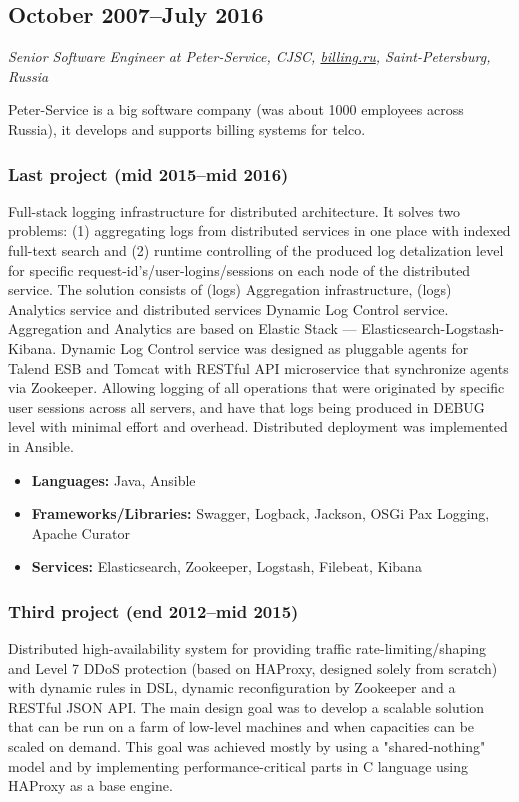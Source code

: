 \subsection*{October 2007--July 2016}

\textit{Senior Software Engineer at Peter-Service, CJSC,
\href{https://billing.ru}{\url{billing.ru}}, Saint-Petersburg, Russia}

Peter-Service is a big software company (was about 1000 employees
across Russia), it develops and supports billing systems for telco.

\subsubsection*{Last project (mid 2015--mid 2016)}

Full-stack logging infrastructure for distributed architecture. It
solves two problems: (1) aggregating logs from distributed services in
one place with indexed full-text search and (2) runtime controlling of
the produced log detalization level for specific
request-id's/user-logins/sessions on each node of the distributed
service. The solution consists of (logs) Aggregation infrastructure, (logs)
Analytics service and distributed services Dynamic Log Control
service. Aggregation and Analytics are based on Elastic Stack ---
Elasticsearch-Logstash-Kibana. Dynamic Log Control service was
designed as pluggable agents for Talend ESB and Tomcat with RESTful
API microservice that synchronize agents via Zookeeper. Allowing
logging of all operations that were originated by specific
user sessions across all servers, and have that logs being produced in
DEBUG level with minimal effort and overhead. Distributed deployment was
implemented in Ansible.

\begin{itemize}[noitemsep, nosep]
  \item \textbf{Languages:} Java, Ansible
  \item \textbf{Frameworks/Libraries:} Swagger, Logback, Jackson, OSGi
Pax Logging, Apache Curator
  \item \textbf{Services:} Elasticsearch, Zookeeper, Logstash,
Filebeat, Kibana
\end{itemize}

\subsubsection*{Third project (end 2012--mid 2015)}

Distributed high-availability system for providing traffic
rate-limiting/shaping and Level 7 DDoS protection (based on HAProxy,
designed solely from scratch) with dynamic rules in DSL, dynamic
reconfiguration by Zookeeper and a RESTful JSON API. The main design
goal was to develop a scalable solution that can be run on a farm of
low-level machines and when capacities can be scaled on demand. This
goal was achieved mostly by using a "shared-nothing" model and by
implementing performance-critical parts in C language using HAProxy as
a base engine.

